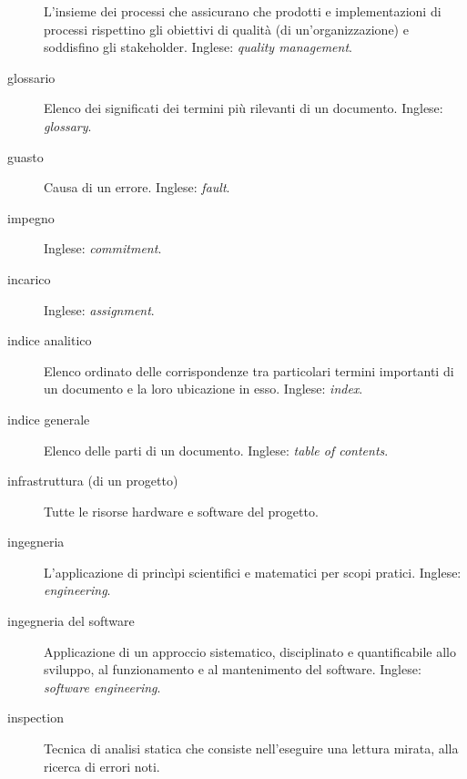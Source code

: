 \documentclass[a4paper]{article}
\begin{document}
\begin{description}
			L'insieme dei processi che assicurano che prodotti e implementazioni di processi rispettino gli obiettivi di qualità (di un'organizzazione) e soddisfino gli stakeholder. Inglese: \emph{quality management}.
			
	\item[glossario] 

			Elenco dei significati dei termini più rilevanti di un documento. Inglese: \emph{glossary}.
			
	\item[guasto] 

			Causa di un errore. Inglese: \emph{fault}.
			
	\item[impegno] 

			 Inglese: \emph{commitment}.
			
	\item[incarico] 

			 Inglese: \emph{assignment}.
			
	\item[indice analitico] 

			Elenco ordinato delle corrispondenze tra particolari termini importanti di un documento e la loro ubicazione in esso. Inglese: \emph{index}.
			
	\item[indice generale] 

			Elenco delle parti di un documento. Inglese: \emph{table of contents}.
			
	\item[infrastruttura (di un progetto)] 

			Tutte le risorse hardware e software del progetto.
			
	\item[ingegneria] 

			L'applicazione di princìpi scientifici e matematici per scopi pratici. Inglese: \emph{engineering}.
			
	\item[ingegneria del software] 

			Applicazione di un approccio sistematico, disciplinato e quantificabile allo sviluppo, al funzionamento e al mantenimento del software. Inglese: \emph{software engineering}.
			
	\item[inspection] 

			Tecnica di analisi statica che consiste nell'eseguire una lettura mirata, alla ricerca di errori noti.
			

\end{description}
\end{document}
